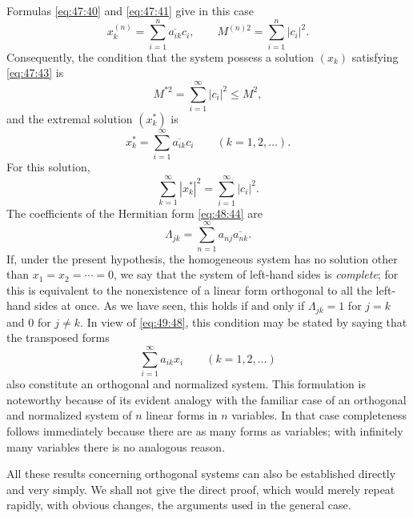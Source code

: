 \documentclass[
  paper=b5,
  fontsize=13pt,
  twoside=true,
  open=any,
  bookmarkpackage=false,
  chapterprefix=true,
  headings=normal
]{scrbook}
\theoremstyle{definition}
\begin{document}
Formulas \eqref{eq:47:40} and \eqref{eq:47:41} give in this case
\[
  x_k^{(n)}=\sum_{i=1}^{n}\overline{a_{ik}}c_i,
  \qquad M^{(n)2}=\sum_{i=1}^{n}|c_i|^2.
\]
Consequently, the condition that the system possess a solution $(x_k)$
satisfying \eqref{eq:47:43} is
\[
  M^{*2}=\sum_{i=1}^{\infty}|c_i|^2\leq M^2,
\]
and the extremal solution $(x_k^*)$ is
\[
  x_k^*=\sum_{i=1}^{\infty}\overline{a_{ik}}c_i
  \qquad(k=1,2,\ldots).
\]
For this solution,
\[
  \sum_{k=1}^{\infty}|x_k^*|^2=\sum_{i=1}^{\infty}|c_i|^2.
\]
The coefficients of the Hermitian form \eqref{eq:48:44} are
\begin{equation}
  \Lambda_{jk}=\sum_{n=1}^{\infty}a_{nj}\overline{a_{nk}}.
  \tag{48}\label{eq:49:48}
\end{equation}
If, under the present hypothesis, the homogeneous system has no solution
other than $x_1=x_2=\cdots=0$, we say that the system of left-hand sides is
\emph{complete}; for this is equivalent to the nonexistence of a linear
form orthogonal to all the left-hand sides at once. As we have seen, this
holds if and only if $\Lambda_{jk}=1$ for $j=k$ and $0$ for $j\neq k$.
In view of \eqref{eq:49:48}, this condition may be stated by saying that
the transposed forms
\[
  \sum_{i=1}^{\infty}a_{ik}x_i\qquad(k=1,2,\ldots)
\]
also constitute an orthogonal and normalized system. This formulation is
noteworthy because of its evident analogy with the familiar case of an
orthogonal and normalized system of $n$ linear forms in $n$ variables. In
that case completeness follows immediately because there are as many forms
as variables; with infinitely many variables there is no analogous reason.

All these results concerning orthogonal systems can also be established
directly and very simply. We shall not give the direct proof, which would
merely repeat rapidly, with obvious changes, the arguments used in the
general case.
\end{document}
